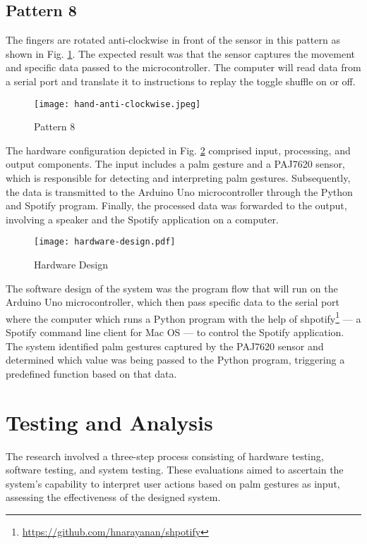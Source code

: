 \documentclass[conference,a4paper]{IEEEtran}
\begin{document}
\subsection{Pattern 8}
The fingers are rotated anti-clockwise in front of the sensor in this pattern  as shown in Fig. \ref{fig:pattern-8}. The expected result was that the sensor captures the movement and specific data passed to the microcontroller. The computer will read data from a serial port and translate it to instructions to replay the toggle shuffle on or off.

\begin{figure}[!h]
    \centering
    \texttt{[image: hand-anti-clockwise.jpeg]}
    \caption{Pattern 8}
    \label{fig:pattern-8}
\end{figure}

The hardware configuration depicted in Fig. \ref{fig:hardware-design} comprised input, processing, and output components. The input includes a palm gesture and a PAJ7620 sensor, which is responsible for detecting and interpreting palm gestures. Subsequently, the data is transmitted to the Arduino Uno microcontroller through the Python and Spotify program. Finally, the processed data was forwarded to the output, involving a speaker and the Spotify application on a computer.

\begin{figure}[tbh!]
    \centering
    \texttt{[image: hardware-design.pdf]}
    \caption{Hardware Design}
    \label{fig:hardware-design}
\end{figure}

The software design of the system was the program flow that will run on the Arduino Uno microcontroller, which then pass specific data to the serial port where the computer which runs a Python program with the help of shpotify\footnote{\url{https://github.com/hnarayanan/shpotify}} --- a Spotify command line client for Mac OS --- to control the Spotify application. The system identified palm gestures captured by the PAJ7620 sensor and determined which value was being passed to the Python program, triggering a predefined function based on that data. 

\section{Testing and Analysis}
The research involved a three-step process consisting of hardware testing, software testing, and system testing. These evaluations aimed to ascertain the system's capability to interpret user actions based on palm gestures as input, assessing the effectiveness of the designed system.
\end{document}
